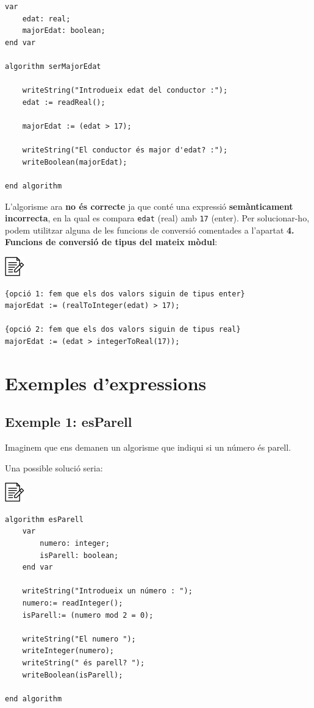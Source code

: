 \documentclass[]{book}
\begin{document}
\begin{verbatim}
var
    edat: real;
    majorEdat: boolean;
end var

algorithm serMajorEdat

    writeString("Introdueix edat del conductor :");
    edat := readReal();

    majorEdat := (edat > 17);

    writeString("El conductor és major d'edat? :");
    writeBoolean(majorEdat);

end algorithm
\end{verbatim}

L'algorisme ara \textbf{no és correcte} ja que conté una expressió
\textbf{semànticament incorrecta}, en la qual es compara \texttt{edat}
(real) amb \texttt{17} (enter). Per solucionar-ho, podem utilitzar
alguna de les funcions de conversió comentades a l'apartat \textbf{4.
Funcions de conversió de tipus del mateix mòdul}:

\includegraphics{./img/alg.png}

\begin{verbatim}
{opció 1: fem que els dos valors siguin de tipus enter}
majorEdat := (realToInteger(edat) > 17);    

{opció 2: fem que els dos valors siguin de tipus real}
majorEdat := (edat > integerToReal(17));
\end{verbatim}

\section{Exemples d'expressions}\label{exemples-dexpressions}

\subsection{Exemple 1: esParell}\label{exemple-1-esparell}

Imaginem que ens demanen un algorisme que indiqui si un número és
parell.

Una possible solució seria:

\includegraphics{./img/alg.png}

\begin{verbatim}
algorithm esParell
    var
        numero: integer;
        isParell: boolean;
    end var

    writeString("Introdueix un número : ");
    numero:= readInteger();
    isParell:= (numero mod 2 = 0);
    
    writeString("El numero ");
    writeInteger(numero);
    writeString(" és parell? ");
    writeBoolean(isParell);

end algorithm
\end{verbatim}
\end{document}
